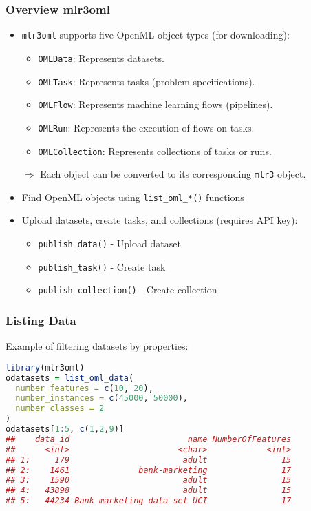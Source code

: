 \documentclass[10pt,compress,t,notes=noshow, xcolor=table]{beamer}
\begin{document}
\begin{frame}[fragile]
\frametitle{Overview mlr3oml}
\begin{itemize}
\item \texttt{mlr3oml} supports five OpenML object types (for downloading):
\begin{itemize}
\item \texttt{OMLData}: Represents datasets.
\item \texttt{OMLTask}: Represents tasks (problem specifications).
\item \texttt{OMLFlow}: Represents machine learning flows (pipelines).
\item \texttt{OMLRun}: Represents the execution of flows on tasks.
\item \texttt{OMLCollection}: Represents collections of tasks or runs.
\end{itemize}
$\Rightarrow$ Each object can be converted to its corresponding \texttt{mlr3} object.
\end{itemize}
\begin{itemize}
\item Find OpenML objects using \texttt{list\_oml\_*()} functions
\item Upload datasets, create tasks, and collections (requires API key):
\begin{itemize}
\item \texttt{publish\_data()} - Upload dataset
\item \texttt{publish\_task()} - Create task
\item \texttt{publish\_collection()} - Create collection
\end{itemize}
\end{itemize}
\end{frame}

\begin{frame}[fragile]
\frametitle{Listing Data}
Example of filtering datasets by properties:
\begin{lstlisting}[language=R]
library(mlr3oml)
odatasets = list_oml_data(
  number_features = c(10, 20),
  number_instances = c(45000, 50000),
  number_classes = 2
)
odatasets[1:5, c(1,2,9)]
##    data_id                        name NumberOfFeatures
##      <int>                      <char>            <int>
## 1:     179                       adult               15
## 2:    1461              bank-marketing               17
## 3:    1590                       adult               15
## 4:   43898                       adult               15
## 5:   44234 Bank_marketing_data_set_UCI               17
\end{lstlisting}
\end{frame}
\end{document}
